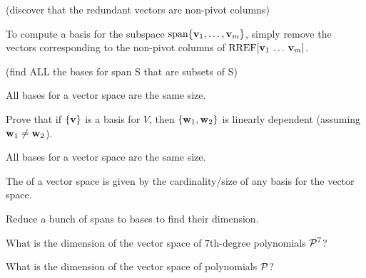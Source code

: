 
\begin{applicationActivities}{3}{14}

\begin{activity}{10}
  (discover that the redundant vectors are non-pivot columns)
\end{activity}

\begin{fact}
  To compute a basis for the subspace \(\vspan\{\vect v_1,\dots,\vect v_m\}\),
  simply remove the vectors corresponding to the non-pivot columns of
  \(\RREF[\vect v_1\,\dots\,\vect v_m]\).
\end{fact}

\begin{activity}{10}
  (find ALL the bases for span S that are subsets of S)
\end{activity}

\begin{fact}
  All bases for a vector space are the same size.
\end{fact}

\begin{activity}{10}
  Prove that if \(\{\vect v\}\) is a basis for \(V\),
  then \(\{\vect w_1,\vect w_2\}\) is linearly dependent (assuming
  \(\vect w_1\not=\vect w_2\)).
\end{activity}

\begin{fact}
  All bases for a vector space are the same size.
\end{fact}

\begin{definition}
  The  of a vector space is given by the cardinality/size
  of any basis for the vector space.
\end{definition}

\begin{activity}{10}
  Reduce a bunch of spans to bases to find their dimension.
\end{activity}

\begin{activity}{5}
  What is the dimension of the vector space of \(7\)th-degree polynomials
  \(\P^7\)?
\end{activity}

\begin{activity}{5}
  What is the dimension of the vector space of polynomials
  \(\P\)?
\end{activity}


\end{applicationActivities}
